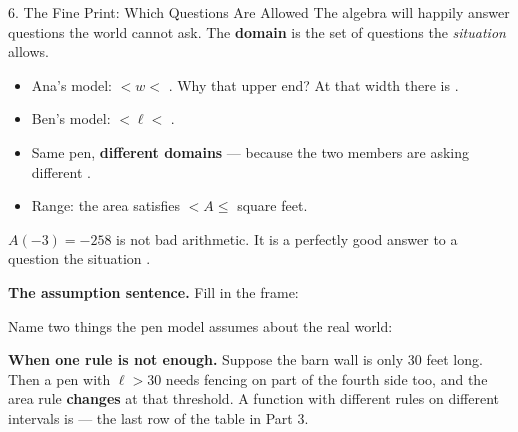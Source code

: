 \documentclass[10pt]{article}
\begin{document}
\vspace{0.1in}

\boxguard[20]
\begin{notesbox}{6. The Fine Print: Which Questions Are Allowed}
The algebra will happily answer questions the world cannot ask. The
\textbf{domain} is the set of questions the \textit{situation} allows.

\medskip
\begin{itemize}[itemsep=5pt]
  \item Ana's model: \blank{1.2cm} $< w <$ \blank{1.2cm}. \quad Why that upper
        end? At that width there is \blank{4.6cm}.
  \item Ben's model: \blank{1.2cm} $< \ell <$ \blank{1.2cm}.
  \item Same pen, \textbf{different domains} --- because the two members are
        asking different \blank{2.4cm}.
  \item Range: the area satisfies \blank{1.2cm} $< A \le$ \blank{1.6cm}
        square feet.
\end{itemize}

\smallskip
$A(-3) = -258$ is not bad arithmetic. It is a perfectly good answer to a
question the situation \blank{3.4cm}.

\medskip
\textbf{The assumption sentence.} Fill in the frame:

\smallskip
\begin{center}
\end{center}

\medskip
Name two things the pen model assumes about the real world:

\writeline

\medskip
\textbf{When one rule is not enough.} Suppose the barn wall is only 30 feet
long. Then a pen with $\ell > 30$ needs fencing on part of the fourth side too,
and the area rule \textbf{changes} at that threshold. A function with different
rules on different intervals is \blank{3cm} --- the last row of the table in
Part 3.
\end{notesbox}

\vspace{0.1in}
\end{document}
